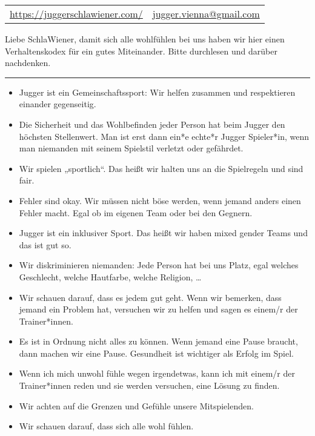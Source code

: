 \documentclass{assignment}
\begin{document}
\pagestyle{empty}

\begin{table}[h!]
    \centering
    \begin{tabularx}{\textwidth}{X  r}
        \footnotesize \url{https://juggerschlawiener.com/}&\footnotesize \url{jugger.vienna@gmail.com}
    \end{tabularx}
    
    \vspace{30pt}

\end{table}




Liebe SchlaWiener, damit sich alle wohlfühlen bei uns haben wir hier einen Verhaltenskodex für ein gutes Miteinander. Bitte durchlesen und darüber nachdenken. 

\rule{\textwidth}{0.4pt}

\begin{itemize}
    \item Jugger ist ein Gemeinschaftssport: Wir helfen zusammen und respektieren einander gegenseitig.
    \item Die Sicherheit und das Wohlbefinden jeder Person hat beim Jugger den höchsten Stellenwert. Man ist erst dann ein*e echte*r Jugger Spieler*in, wenn man niemanden mit seinem Spielstil verletzt oder gefährdet.
    \item Wir spielen „sportlich“. Das heißt wir halten uns an die Spielregeln und sind fair.
    \item Fehler sind okay. Wir müssen nicht böse werden, wenn jemand anders einen Fehler macht. Egal ob im eigenen Team oder bei den Gegnern.
    \item Jugger ist ein inklusiver Sport. Das heißt wir haben mixed gender Teams und das ist gut so.
    \item Wir diskriminieren niemanden: Jede Person hat bei uns Platz, egal welches Geschlecht, welche Hautfarbe, welche Religion, …
    \item Wir schauen darauf, dass es jedem gut geht. Wenn wir bemerken, dass jemand ein Problem hat, versuchen wir zu helfen und sagen es einem/r der Trainer*innen. 
    \item Es ist in Ordnung nicht alles zu können. Wenn jemand eine Pause braucht, dann machen wir eine Pause. Gesundheit ist wichtiger als Erfolg im Spiel.
    \item Wenn ich mich unwohl fühle wegen irgendetwas, kann ich mit einem/r der Trainer*innen reden und sie werden versuchen, eine Lösung zu finden. 
    \item Wir achten auf die Grenzen und Gefühle unsere Mitspielenden.
    \item Wir schauen darauf, dass sich alle wohl fühlen.
\end{itemize}
\end{document}
